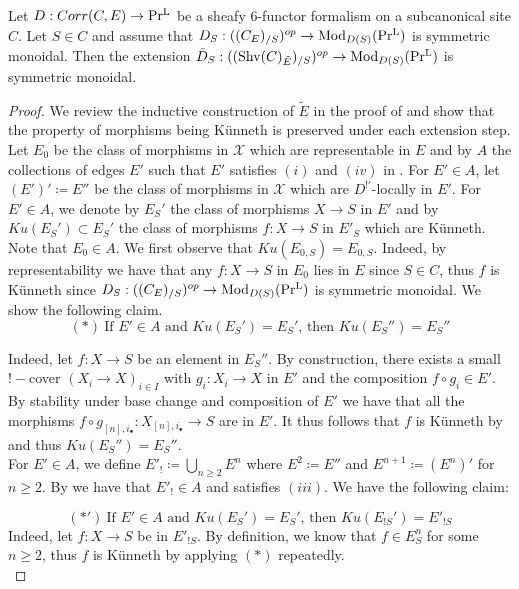 \begin{theorem}\label{Künnethextension-main theorem}
    Let $D: Corr(C,E) \to \operatorname{Pr^{L}}$ be a sheafy $6$-functor formalism on a subcanonical site $C$. Let $S\in C$ and assume that $D_S: ((C_E){{_{/S}}})^{op} \to \operatorname{Mod}_{D(S)}(\operatorname{Pr^{L}})$ is symmetric monoidal. Then the extension $\tilde{D}_S: ((\operatorname{Shv}(C)_{\tilde{E}}){{_{/S}}})^{op}\to \operatorname{Mod}_{D(S)}(\operatorname{Pr^{L}}) $ is symmetric monoidal.
\end{theorem}
\begin{proof}
We review the inductive construction of $\tilde{E}$ in the proof of \Cite[Theorem 3.4.11.]{heyer20246} and show that the property of morphisms being Künneth is preserved under each extension step. Let $E_0$ be the class of morphisms in $\mathcal{X}$ which are representable in $E$ and by $A$ the collections of edges $E'$ such that $E'$ satisfies $(i)$ and $(iv)$ in . For $E' \in A$, let $(E')'\coloneqq E''$ be the class of morphisms in $\mathcal{X}$ which are $D^{!'}$-locally in $E'$. For $E'\in A$, we denote by $E_S'$ the class of morphisms $X \to S$ in $E'$ and by $Ku(E_S')\subset E_S'$ the class of morphisms $f: X \to S$ in $E'_S$ which are Künneth. Note that $E_0 \in A$. We first observe that $Ku(E_{0,S})=E_{0,S}$. Indeed, by representability we have that any $f : X \to S$ in $E_0$ lies in $E$ since $S\in C$, thus $f$ is Künneth since $D_S: ((C_E){{_{/S}}})^{op} \to \operatorname{Mod}_{D(S)}(\operatorname{Pr^{L}})$ is symmetric monoidal. We show the following claim.
\[
(\ast) \ \text{If $E'\in A$ and $Ku(E_S')= E_S'$, then $Ku(E_S'')= E_S''$}
\]

Indeed, let $f: X \to S$ be an element in $E_S''$. By construction, there exists a small $!-$cover $(X_i\to X)_{i\in I}$ with $g_i:X_i\to X$ in $E'$ and the composition $f\circ g_i \in E'$. By stability under base change and composition of $E'$ we have that all the morphisms $f\circ g_{[n],i_\bullet}: X_{[n],i_\bullet} \to S$ are in $E'$. It thus follows that $f$ is Künneth by  and thus $Ku(E_S'')=E_S''$. \\ For $E'\in A$, we define $E'_!\coloneqq \bigcup_{n\geq2}E^n$ where $E^2\coloneqq E''$ and $E^{n+1}\coloneqq (E^n)'$ for $n \geq 2$. By \Cite[Theorem 3.4.11]{heyer20246} we have that $E'_! \in A$ and satisfies $(iii)$. We have the following claim:

\[
(\ast') \ \text{If $E'\in A$ and $Ku(E_S')= E_S'$, then $Ku({E_{!S}'})= E'_{!S}$}
\]
Indeed, let $f: X \to S$ be in $E'_{!S}$. By definition, we know that $f\in E^n_S$ for some $n\ge2$, thus $f$ is Künneth by applying $(\ast)$ repeatedly. \\



\end{proof}
